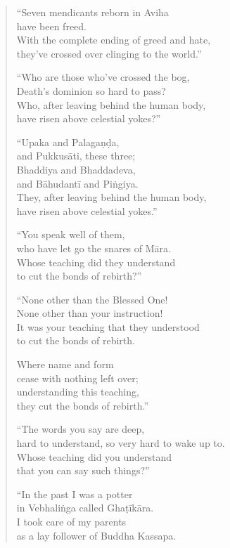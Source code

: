 \documentclass[12pt,openany]{book}%
\begin{document}
\begin{verse}%
“Seven mendicants reborn in Aviha \\
have been freed. \\
With the complete ending of greed and hate, \\
they’ve crossed over clinging to the world.” 

“Who are those who’ve crossed the bog, \\
Death’s dominion so hard to pass? \\
Who, after leaving behind the human body, \\
have risen above celestial yokes?” 

“Upaka and \textsanskrit{Palagaṇḍa}, \\
and \textsanskrit{Pukkusāti}, these three; \\
Bhaddiya and Bhaddadeva, \\
and \textsanskrit{Bāhudantī} and \textsanskrit{Piṅgiya}. \\
They, after leaving behind the human body, \\
have risen above celestial yokes.” 

“You speak well of them, \\
who have let go the snares of \textsanskrit{Māra}. \\
Whose teaching did they understand \\
to cut the bonds of rebirth?” 

“None other than the Blessed One! \\
None other than your instruction! \\
It was your teaching that they understood \\
to cut the bonds of rebirth. 

Where name and form \\
cease with nothing left over; \\
understanding this teaching, \\
they cut the bonds of rebirth.” 

“The words you say are deep, \\
hard to understand, so very hard to wake up to. \\
Whose teaching did you understand \\
that you can say such things?” 

“In the past I was a potter \\
in \textsanskrit{Vebhaliṅga} called \textsanskrit{Ghaṭīkāra}. \\
I took care of my parents \\
as a lay follower of Buddha Kassapa. 


\end{verse}
\end{document}
